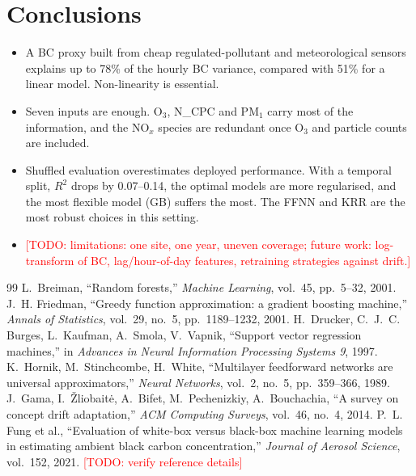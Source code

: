 \documentclass[11pt,a4paper]{article}
\newcommand{\todo}[1]{\textcolor{red}{[TODO: #1]}}
\begin{document}
\section{Conclusions}
\begin{itemize}
  \item A BC proxy built from cheap regulated-pollutant and meteorological sensors explains up to 78\% of the hourly BC variance, compared with 51\% for a linear model. Non-linearity is essential.
  \item Seven inputs are enough. O$_3$, N\_CPC and PM$_1$ carry most of the information, and the NO$_x$ species are redundant once O$_3$ and particle counts are included.
  \item Shuffled evaluation overestimates deployed performance. With a temporal split, $R^2$ drops by 0.07--0.14, the optimal models are more regularised, and the most flexible model (GB) suffers the most. The FFNN and KRR are the most robust choices in this setting.
  \item \todo{limitations: one site, one year, uneven coverage; future work: log-transform of BC, lag/hour-of-day features, retraining strategies against drift.}
\end{itemize}

\begin{thebibliography}{99}\small
{} L.~Breiman, ``Random forests,'' \emph{Machine Learning}, vol.~45, pp.~5--32, 2001.
 J.~H. Friedman, ``Greedy function approximation: a gradient boosting machine,'' \emph{Annals of Statistics}, vol.~29, no.~5, pp.~1189--1232, 2001.
 H.~Drucker, C.~J.~C. Burges, L.~Kaufman, A.~Smola, V.~Vapnik, ``Support vector regression machines,'' in \emph{Advances in Neural Information Processing Systems 9}, 1997.
 K.~Hornik, M.~Stinchcombe, H.~White, ``Multilayer feedforward networks are universal approximators,'' \emph{Neural Networks}, vol.~2, no.~5, pp.~359--366, 1989.
 J.~Gama, I.~\v{Z}liobait\.{e}, A.~Bifet, M.~Pechenizkiy, A.~Bouchachia, ``A survey on concept drift adaptation,'' \emph{ACM Computing Surveys}, vol.~46, no.~4, 2014.
 P.~L. Fung et al., ``Evaluation of white-box versus black-box machine learning models in estimating ambient black carbon concentration,'' \emph{Journal of Aerosol Science}, vol.~152, 2021. \todo{verify reference details}
\end{thebibliography}
\end{document}
